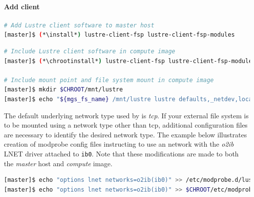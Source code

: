 \documentclass[letterpaper]{article}
\newcommand{\baseOS}{CentOS7.1}
\newcommand{\install}{yum -y install}
\newcommand{\chrootinstall}{yum -y --installroot=\$CHROOT install}
\begin{document}
\paragraph{Add \Lustre{} client} \label{sec:lustre_client}



\begin{lstlisting}[language=bash,keywords={},upquote=true]
# Add Lustre client software to master host
[master]$ (*\install*) lustre-client-fsp lustre-client-fsp-modules
\end{lstlisting}

\begin{lstlisting}[language=bash,keywords={},upquote=true]
# Include Lustre client software in compute image
[master]$ (*\chrootinstall*) lustre-client-fsp lustre-client-fsp-modules

# Include mount point and file system mount in compute image
[master]$ mkdir $CHROOT/mnt/lustre
[master]$ echo "${mgs_fs_name} /mnt/lustre lustre defaults,_netdev,localflock 0 0" >> $CHROOT/etc/fstab
\end{lstlisting}

The default underlying network type used by \Lustre{} is {\em tcp}. If your
external \Lustre{} file system is to be mounted using a network type other than
tcp, additional configuration files are necessary to identify the desired
network type. The example below illustrates creation of modprobe config files
instructing \Lustre{} to use an \InfiniBand{} network with the {\em o2ib} LNET driver
attached to \texttt{ib0}. Note that these modifications are made to both the
{\em master} host and {\em compute} image.

\begin{lstlisting}[language=bash,keywords={},upquote=true]
[master]$ echo "options lnet networks=o2ib(ib0)" >> /etc/modprobe.d/lustre.conf
[master]$ echo "options lnet networks=o2ib(ib0)" >> $CHROOT/etc/modprobe.d/lustre.conf
\end{lstlisting}
\end{document}
